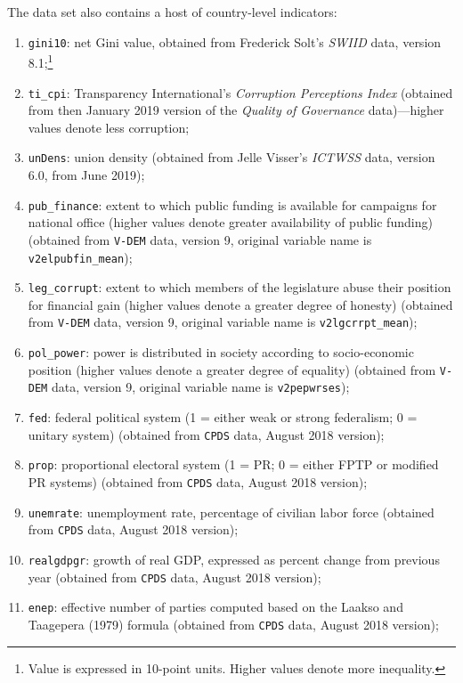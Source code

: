 \documentclass[12pt,english]{article}
\begin{document}
The data set also contains a host of country-level indicators:

\begin{enumerate}
  \item \texttt{gini10}: net Gini value, obtained from Frederick Solt's \textit{SWIID} data, version 8.1;\footnote{Value is expressed in 10-point units. Higher values denote more inequality.}
  \item \texttt{ti\_cpi}: Transparency International's \textit{Corruption Perceptions Index} (obtained from then January 2019 version of the \textit{Quality of Governance} data)---higher values denote less corruption;
  \item \texttt{unDens}: union density (obtained from Jelle Visser's \textit{ICTWSS} data, version 6.0, from June 2019);
  \item \texttt{pub\_finance}: extent to which public funding is available for campaigns for national office (higher values denote greater availability of public funding) (obtained from \texttt{V-DEM} data, version 9, original variable name is \texttt{v2elpubfin\_mean});
  \item \texttt{leg\_corrupt}: extent to which members of the legislature abuse their position for financial gain (higher values denote a greater degree of honesty) (obtained from \texttt{V-DEM} data, version 9, original variable name is \texttt{v2lgcrrpt\_mean});
  \item \texttt{pol\_power}: power is distributed in society according to socio-economic position (higher values denote a greater degree of equality) (obtained from \texttt{V-DEM} data, version 9, original variable name is \texttt{v2pepwrses});
  \item \texttt{fed}: federal political system (1 = either weak or strong federalism; 0 = unitary system) (obtained from \texttt{CPDS} data, August 2018 version); 
  \item \texttt{prop}: proportional electoral system (1 = PR; 0 = either FPTP or modified PR systems) (obtained from \texttt{CPDS} data, August 2018 version);
  \item \texttt{unemrate}: unemployment rate, percentage of civilian labor force (obtained from \texttt{CPDS} data, August 2018 version);
  \item \texttt{realgdpgr}: growth of real GDP, expressed as percent change from previous year (obtained from \texttt{CPDS} data, August 2018 version);
  \item \texttt{enep}: effective number of parties computed based on the Laakso and Taagepera (1979) formula (obtained from \texttt{CPDS} data, August 2018 version);

\end{enumerate}
\end{document}
